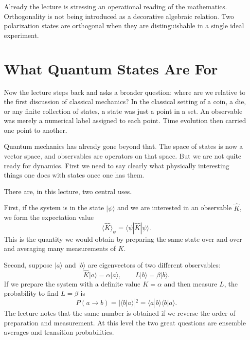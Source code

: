 Already the lecture is stressing an operational reading of the mathematics. Orthogonality is not being introduced as a decorative algebraic relation. Two polarization states are orthogonal when they are distinguishable in a single ideal experiment.

\section{What Quantum States Are For}

Now the lecture steps back and asks a broader question: where are we relative to the first discussion of classical mechanics? In the classical setting of a coin, a die, or any finite collection of states, a state was just a point in a set. An observable was merely a numerical label assigned to each point. Time evolution then carried one point to another.

Quantum mechanics has already gone beyond that. The space of states is now a vector space, and observables are operators on that space. But we are not quite ready for dynamics. First we need to say clearly what physically interesting things one does with states once one has them.

There are, in this lecture, two central uses.

First, if the system is in the state $|\psi\rangle$ and we are interested in an observable $\hat K$, we form the expectation value
\begin{equation}
\langle \hat K\rangle_\psi=\langle\psi|\hat K|\psi\rangle.
\end{equation}
This is the quantity we would obtain by preparing the same state over and over and averaging many measurements of $K$.

Second, suppose $|a\rangle$ and $|b\rangle$ are eigenvectors of two different observables:
\begin{equation}
\hat K|a\rangle=\alpha |a\rangle,
\qquad
\hat L|b\rangle=\beta |b\rangle.
\end{equation}
If we prepare the system with a definite value $K=\alpha$ and then measure $L$, the probability to find $L=\beta$ is
\begin{equation}
P(a\to b)=|\langle b|a\rangle|^2
=\langle a|b\rangle\langle b|a\rangle.
\end{equation}
The lecture notes that the same number is obtained if we reverse the order of preparation and measurement. At this level the two great questions are ensemble averages and transition probabilities.

